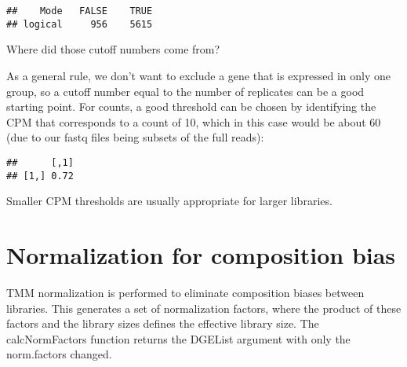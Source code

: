 \documentclass[
]{book}
\newenvironment{Shaded}{\begin{snugshade}}{\end{snugshade}}
\newcommand{\DecValTok}[1]{\textcolor[rgb]{0.00,0.00,0.81}{#1}}
\newcommand{\FunctionTok}[1]{\textcolor[rgb]{0.13,0.29,0.53}{\textbf{#1}}}
\newcommand{\NormalTok}[1]{#1}
\newcommand{\OtherTok}[1]{\textcolor[rgb]{0.56,0.35,0.01}{#1}}
\newcommand{\SpecialCharTok}[1]{\textcolor[rgb]{0.81,0.36,0.00}{\textbf{#1}}}
\begin{document}
\begin{verbatim}
##    Mode   FALSE    TRUE 
## logical     956    5615
\end{verbatim}

Where did those cutoff numbers come from?

As a general rule, we don't want to exclude a gene that is expressed in
only one group, so a cutoff number equal to the number of replicates can
be a good starting point. For counts, a good threshold can be chosen by
identifying the CPM that corresponds to a count of 10, which in this
case would be about 60 (due to our fastq files being subsets of the full
reads):

\begin{Shaded}
\end{Shaded}

\begin{verbatim}
##      [,1]
## [1,] 0.72
\end{verbatim}

Smaller CPM thresholds are usually appropriate for larger libraries.

\hypertarget{normalization-for-composition-bias-1}{%
\section{Normalization for composition bias}\label{normalization-for-composition-bias-1}}

TMM normalization is performed to eliminate composition biases between
libraries. This generates a set of normalization factors, where the
product of these factors and the library sizes defines the effective
library size. The calcNormFactors function returns the DGEList argument
with only the norm.factors changed.

\begin{Shaded}
\end{Shaded}
\end{document}

